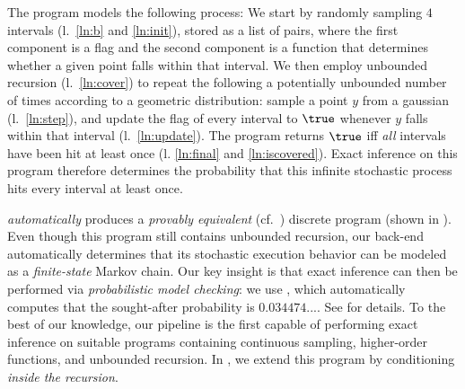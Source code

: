 The program models the following process: We start by randomly sampling $4$ intervals (l.\ \ref{ln:b} and \ref{ln:init}), stored as a list of pairs, where the first component is a flag and the second component is a function that determines whether a given point falls within that interval. We then employ unbounded recursion (l.\ \ref{ln:cover}) to repeat the following a potentially unbounded number of times according to a geometric distribution: sample a point $y$ from a gaussian (l.\ \ref{ln:step}), and update the flag of every interval to $\true$ whenever $y$ falls within that interval (l.\ \ref{ln:update}). The program returns $\true$ iff \emph{all} intervals have been hit at least once (l. \ref{ln:final} and \ref{ln:iscovered}). Exact inference on this program therefore determines the probability that this infinite stochastic process hits every interval at least once.

\Slice{} \emph{automatically} produces a \emph{provably equivalent} (cf.\ ) discrete program (shown in ). Even though this program still contains unbounded recursion, our back-end automatically determines that its stochastic execution behavior can be modeled as a \emph{finite-state} Markov chain. Our key insight is that exact inference can then be performed via \emph{probabilistic model checking}: we use \Storm{} \cite{storm}, which automatically computes that the sought-after probability is $0.034474...$. See  for details. To the best of our knowledge, our pipeline is the first capable of performing exact inference on suitable programs containing continuous sampling, higher-order functions, and unbounded recursion. In , we extend this program by conditioning \emph{inside the recursion}.

%
%
%
%

%
